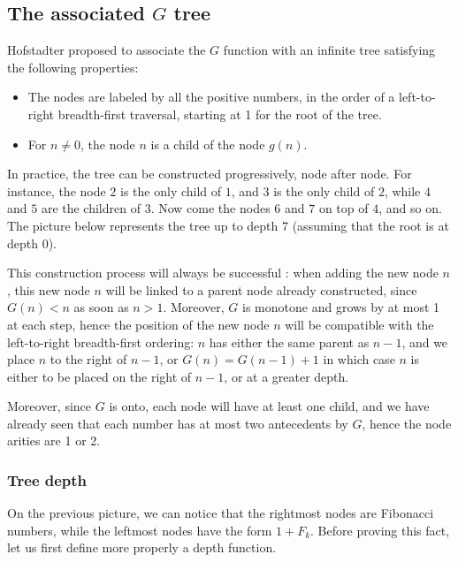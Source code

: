 \documentclass[a4paper,11pt]{article}
\begin{document}
\subsection{The associated $G$ tree}

Hofstadter proposed to associate the $G$ function with an infinite
tree satisfying the following properties:
\begin{itemize}
\item The nodes are labeled by all the positive numbers,
 in the order of a left-to-right breadth-first traversal,
 starting at 1 for the root of the tree.
\item For $n\neq 0$, the node $n$ is a child of the node $g(n)$.
\end{itemize}

In practice, the tree can be constructed progressively, node after node.
For instance, the node $2$ is the only child of $1$, and $3$
is the only child of $2$, while $4$ and $5$ are the children of $3$.
Now come the nodes $6$ and $7$ on top of $4$, and so on. The picture
below represents the tree up to depth 7 (assuming that the root is
at depth 0).

\bigskip


This construction process will always be successful : when adding the
new node $n$, this new node $n$ will be linked
to a parent node already constructed, since $G(n)<n$ as soon as $n>1$.
Moreover, $G$ is monotone and
grows by at most 1 at each step, hence the position of the new node
$n$ will be compatible with the left-to-right breadth-first ordering:
$n$ has either the same parent as $n-1$, and we place $n$ to the right
of $n-1$, or $G(n)=G(n-1)+1$ in which case $n$ is either to be placed
on the right of $n-1$, or at a greater depth.

Moreover, since $G$ is onto, each node will have at least one child,
and we have already seen that each number has at most two antecedents
by $G$, hence the node arities are 1 or 2.

\subsubsection*{Tree depth}
On the previous picture, we can notice that the rightmost nodes are
Fibonacci numbers, while the leftmost nodes have the form $1+F_k$.
Before proving this fact, let us first define more properly a depth
function.
\end{document}
